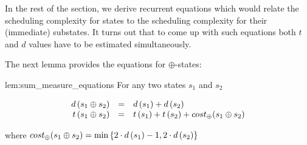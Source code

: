 \begin{comment}
In the rest of the section, we state a number of lemmas providing estimations for these two values. The proofs for the lemmas (when omitted) can be
found in Appendix~\ref{sec:appendix}.

The first lemma provides a fundamental relation between these two~--- $d$ and $t$,~--- estimations for the scheduling complexity:

\begin{lemma}
\label{lem:d_t_relation}
 $d\,(s) \le t\,(s) \le d^2\,(s)$ for any state $s$.
\end{lemma} }
{ \color{red}
\begin{proof}
  Follows immediately from the definitions of the estimated values and the fact that the height of a state increases by at most $1$ at each step.\qed
\end{proof}
}
\end{comment}

In the rest of the section, we derive recurrent equations which would relate the scheduling complexity for states to the scheduling complexity for their
(immediate) substates. It turns out that to come up with such equations both $t$ and $d$ values have to be estimated simultaneously.  




The next lemma provides the equations for $\oplus$-states:

\begin{replemma}{lem:sum_measure_equations}
For any two states $s_1$ and $s_2$

\[
\begin{array}{rcl}
  d\,(s_1 \oplus s_2) &=& d\,(s_1) + d\,(s_2) \\
    t\,(s_1 \oplus s_2) &=& t\,(s_1) + t\,(s_2) + cost_{\oplus}(s_1 \oplus s_2)
\end{array}
\]

where $cost_{\oplus}(s_1 \oplus s_2) = \min\,\{2\cdot d\,(s_1) - 1, 2\cdot d\,(s_2)\}$
\end{replemma}

